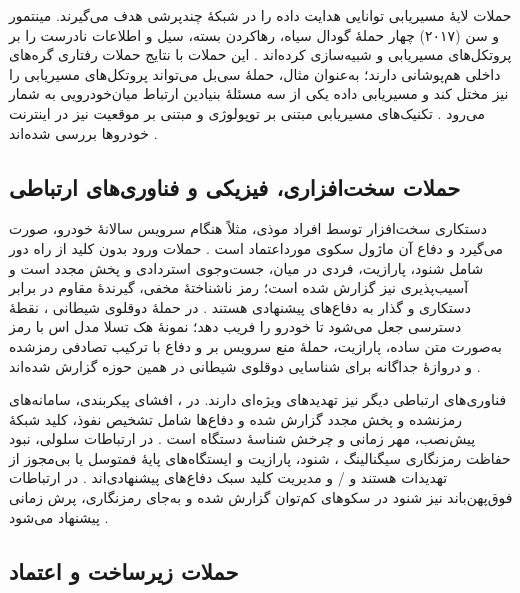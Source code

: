 \documentclass[12pt,a4paper]{article}
\begin{document}
حملات لایهٔ مسیریابی توانایی هدایت داده را در شبکهٔ چندپرشی هدف می‌گیرند. مینتمور و سن (۲۰۱۷) چهار حملهٔ گودال سیاه، رهاکردن بسته، سیل و اطلاعات نادرست را بر پروتکل‌های مسیریابی  و  شبیه‌سازی کرده‌اند \cite{VanetSecurityPrivacy}. این حملات با نتایج حملات رفتاری گره‌های داخلی هم‌پوشانی دارند؛ به‌عنوان مثال، حملهٔ سی‌بل می‌تواند پروتکل‌های مسیریابی را نیز مختل کند \cite{VanetSecurityPrivacy} و مسیریابی داده یکی از سه مسئلهٔ بنیادین ارتباط میان‌خودرویی به شمار می‌رود \cite{hozouriOverviewVANETVehicular2023}. تکنیک‌های مسیریابی مبتنی بر توپولوژی و مبتنی بر موقعیت نیز در اینترنت خودرو‌ها بررسی شده‌اند \cite{xuInternetVehiclesBig2018}.

\subsection{حملات سخت‌افزاری، فیزیکی و فناوری‌های ارتباطی}

دستکاری سخت‌افزار  توسط افراد موذی، مثلاً هنگام سرویس سالانهٔ خودرو، صورت می‌گیرد و دفاع آن ماژول سکوی مورداعتماد است \cite{farsimadanReviewSecurityChallenges2025}. حملات ورود بدون کلید از راه دور  شامل شنود، پارازیت، فردی در میان، جست‌وجوی استردادی و پخش مجدد است و آسیب‌پذیری  نیز گزارش شده است؛ رمز ناشناختهٔ مخفی، گیرندهٔ مقاوم در برابر دستکاری و گذار به  دفاع‌های پیشنهادی هستند \cite{farsimadanReviewSecurityChallenges2025}. در حملهٔ دوقلوی شیطانی ، نقطهٔ دسترسی  جعل می‌شود تا خودرو را فریب دهد؛ نمونهٔ هک تسلا مدل اس با رمز  به‌صورت متن ساده، پارازیت، حملهٔ منع سرویس بر  و دفاع با ترکیب تصادفی رمزشده و دروازهٔ جداگانه برای شناسایی دوقلوی شیطانی در همین حوزه گزارش شده‌اند \cite{farsimadanReviewSecurityChallenges2025}.

فناوری‌های ارتباطی دیگر نیز تهدید‌های ویژه‌ای دارند. در ، افشای پیکربندی، سامانه‌های رمزنشده و پخش مجدد گزارش شده و دفاع‌ها شامل تشخیص نفوذ، کلید شبکهٔ پیش‌نصب، مهر زمانی و چرخش شناسهٔ دستگاه است \cite{farsimadanReviewSecurityChallenges2025}. در ارتباطات سلولی، نبود حفاظت رمزنگاری سیگنالینگ ، شنود، پارازیت و ایستگاه‌های پایهٔ فمتوسل یا بی‌مجوز از تهدیدات هستند و / و مدیریت کلید سبک دفاع‌های پیشنهادی‌اند \cite{farsimadanReviewSecurityChallenges2025}. در ارتباطات فوق‌پهن‌باند نیز شنود در سکو‌های کم‌توان گزارش شده و به‌جای رمزنگاری، پرش زمانی پیشنهاد می‌شود \cite{farsimadanReviewSecurityChallenges2025}.

\subsection{حملات زیرساخت و اعتماد}
\end{document}
